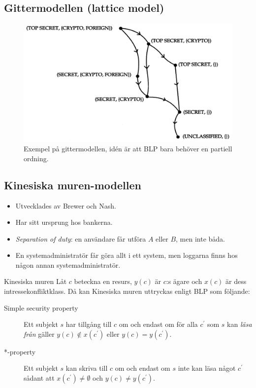 \documentclass{beamer}
\begin{document}
\subsection{Gittermodellen (lattice model)}
\begin{frame}{\insertsubsectionhead}
  \begin{figure}
    \includegraphics[height=0.7\textheight]{lattice.png}
    \caption{Exempel på gittermodellen, idén är att BLP bara behöver en 
    partiell ordning.}
  \end{figure}
\end{frame}

\subsection{Kinesiska muren-modellen}
\begin{frame}{\insertsubsectionhead}
  \begin{itemize}
    \item Utvecklades av Brewer och Nash.
    \item Har sitt ursprung hos bankerna.
    \item \emph{Separation of duty}: en användare får utföra \(A\) eller \(B\), 
      men inte båda.
    \item En systemadministratör får göra allt i ett system, men loggarna finns 
      hos någon annan systemadministratör.
  \end{itemize}
\end{frame}
\begin{frame}{\insertsubsectionhead}
  \begin{block}{Kinesiska muren}
    Låt \(c\) beteckna en resurs, \(y(c)\) är \(c\):s ägare och \(x(c)\) är 
    dess intressekonfliktklass.
    Då kan Kinesiska muren uttryckas enligt BLP som följande:
    \begin{description}
      \item[Simple security property] Ett subjekt \(s\) har tillgång till \(c\) 
        om och endast om för alla \(c^\prime\) som \(s\) kan \emph{läsa från} 
        gäller \(y(c)\notin x(c^\prime)\) eller \(y(c) = y(c^\prime)\).
      \item[*-property] Ett subjekt \(s\) kan skriva till \(c\) om och endast 
        om \(s\) inte kan läsa något \(c^\prime\) sådant att \(x(c^\prime)\neq 
        \emptyset\) och \(y(c)\neq y(c^\prime)\).
    \end{description}
  \end{block}
\end{frame}
\end{document}
